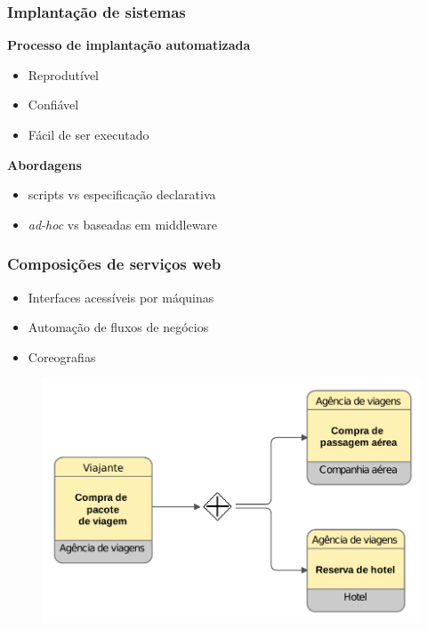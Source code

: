 \documentclass{beamer}
\newcommand\adhoc{\emph{ad-hoc}\xspace}
\newcommand\subtitulo[1]{{\large \textbf{#1}}}
\begin{document}

\begin{frame}
\frametitle{Implantação de sistemas}

\subtitulo{Processo de implantação automatizada}

\begin{itemize}
\item Reprodutível
\item Confiável
\item Fácil de ser executado
\end{itemize}

\vspace{0.4cm}

\subtitulo{Abordagens}

\begin{itemize}
\item scripts vs especificação declarativa
\item \adhoc vs baseadas em middleware
\end{itemize}


\end{frame}


\begin{frame}
\frametitle{Composições de serviços web}

\begin{itemize}
\item Interfaces acessíveis por máquinas
\item Automação de fluxos de negócios
\item Coreografias
\end{itemize}

\begin{figure}
\includegraphics[width=0.7\linewidth]{img/bpmn2}
\end{figure}


\end{frame}
\end{document}
